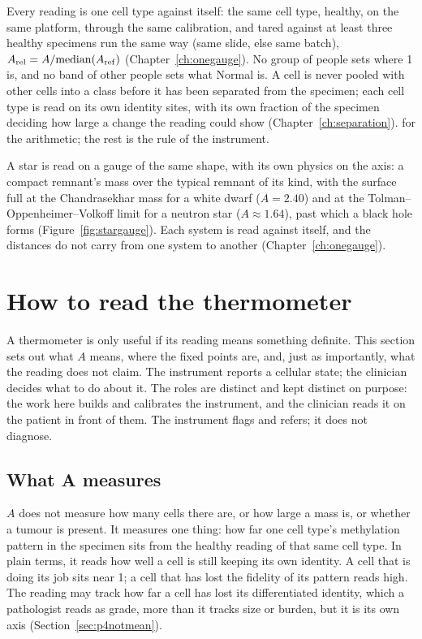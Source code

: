 \begin{keybox}[title=Measured against the cell's own healthy state]
Every reading is one cell type against itself: the same cell type, healthy, on the same platform, through the same calibration, and tared
against at least three healthy specimens run the same way (same slide, else same batch), $A_{\rm rel}=A/\mathrm{median}(A_{\rm ref})$
(Chapter~\ref{ch:onegauge}). No group of people sets where 1 is, and no band of other people sets what Normal is. A cell is never
pooled with other cells into a class before it has been separated from the specimen; each cell type is read on its own identity sites,
with its own fraction of the specimen deciding how large a change the reading could show (Chapter~\ref{ch:separation}). \derived{} for
the arithmetic; the rest is the rule of the instrument.
\end{keybox}

A star is read on a gauge of the same shape, with its own physics on the axis: a compact remnant's mass over the typical remnant of its
kind, with the surface full at the Chandrasekhar mass for a white dwarf ($A=2.40$) and at the Tolman--Oppenheimer--Volkoff limit for a
neutron star ($A\approx1.64$), past which a black hole forms (Figure~\ref{fig:stargauge}). \calc{} Each system is read against itself, and
the distances do not carry from one system to another (Chapter~\ref{ch:onegauge}).

\section{How to read the thermometer}\label{sec:ag_read}

A thermometer is only useful if its reading means something definite. This section sets out what $A$ means, where the fixed points are,
and, just as importantly, what the reading does not claim. The instrument reports a cellular state; the clinician decides what to do
about it. The roles are distinct and kept distinct on purpose: the work here builds and calibrates the instrument, and the clinician reads
it on the patient in front of them. The instrument flags and refers; it does not diagnose.

\subsection{What A measures}

$A$ does not measure how many cells there are, or how large a mass is, or whether a tumour is present. It measures one thing: how far one
cell type's methylation pattern in the specimen sits from the healthy reading of that same cell type. In plain terms, it reads how well a
cell is still keeping its own identity. A cell that is doing its job sits near 1; a cell that has lost the fidelity of its pattern reads
high. The reading may track how far a cell has lost its differentiated identity, which a pathologist reads as grade, more than it tracks
size or burden, but it is its own axis (Section~\ref{sec:p4notmean}). \conjecture

